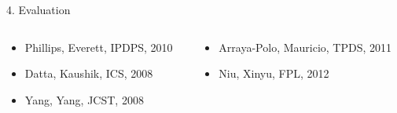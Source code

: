 \begin{frame}{4. Evaluation}
{  }

  {\footnotesize
  \begin{columns}[t]
    \begin{column}{.5\textwidth}
      \begin{itemize}
      \item [1] Phillips, Everett, IPDPS, 2010
      \item [2] Datta, Kaushik, ICS, 2008
      \item [3] Yang, Yang, JCST, 2008
      \end{itemize}
    \end{column}
    \begin{column}{.6\textwidth}
    \begin{itemize}
    \item [4] Arraya-Polo, Mauricio, TPDS, 2011
    \item [5] Niu, Xinyu, FPL, 2012
    \end{itemize}
    \end{column}
  \end{columns}
}

\end{frame}

